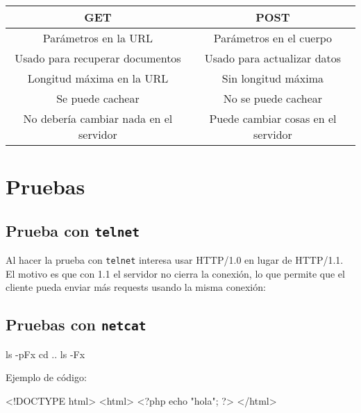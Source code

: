 \documentclass[a4paper,11pt]{memoir}
\begin{document}
\begin{center}
\begin{tabular}{|c|c|}
    \hline 
    \textbf{GET} & \textbf{POST}\\
    \hline 
    \hline 
    Parámetros en la URL & Parámetros en el cuerpo\\
    \hline 
    Usado para recuperar documentos & Usado para actualizar datos\\
    \hline 
    Longitud máxima en la URL & Sin longitud máxima\\
    \hline 
    Se puede cachear & No se puede cachear\\
    \hline 
    No debería cambiar nada en el servidor & Puede cambiar cosas en el servidor\\
    \hline 
\end{tabular}
\end{center}

\section{Pruebas}

\subsection{Prueba con \texttt{telnet}}

Al hacer la prueba con \texttt{telnet} interesa usar HTTP/1.0 en lugar
de HTTP/1.1. El motivo es que con 1.1 el servidor no cierra la conexión,
lo que permite que el cliente pueda enviar más requests usando la
misma conexión:


\subsection{Pruebas con \texttt{netcat}}

\begin{shellsession}[adjusted title=Hola]
ls -pFx
cd ..
ls -Fx
\end{shellsession}

Ejemplo de código:

\begin{htmlphpsimple}
<!DOCTYPE html>
<html>
<?php
echo "hola"; ?>
</html>
\end{htmlphpsimple}
\end{document}
